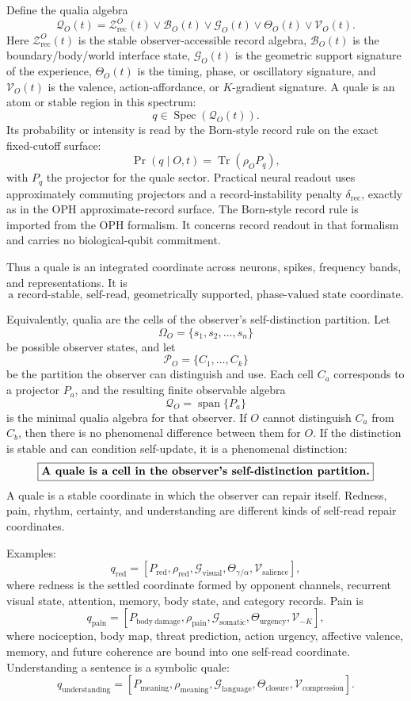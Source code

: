 \documentclass[11pt]{article}
\theoremstyle{remark}
\theoremstyle{plain}
\newcommand{\rec}{\mathrm{rec}}
\begin{document}
Define the qualia algebra
\[
\boxed{
\mathcal Q_O(t)
=
\mathcal Z_{\rec}^{O}(t)
\vee
\mathcal B_O(t)
\vee
\mathcal G_O(t)
\vee
\Theta_O(t)
\vee
\mathcal V_O(t).
}
\]
Here \(\mathcal Z_{\rec}^{O}(t)\) is the stable observer-accessible record algebra, \(\mathcal B_O(t)\) is the boundary/body/world interface state, \(\mathcal G_O(t)\) is the geometric support signature of the experience, \(\Theta_O(t)\) is the timing, phase, or oscillatory signature, and \(\mathcal V_O(t)\) is the valence, action-affordance, or \(K\)-gradient signature. A quale is an atom or stable region in this spectrum:
\[
\boxed{
q\in\operatorname{Spec}(\mathcal Q_O(t)).
}
\]
Its probability or intensity is read by the Born-style record rule on the exact fixed-cutoff surface:
\[
\Pr(q\mid O,t)=\operatorname{Tr}(\rho_O P_q),
\]
with \(P_q\) the projector for the quale sector. Practical neural readout uses approximately commuting projectors and a record-instability penalty \(\delta_{\rec}\), exactly as in the OPH approximate-record surface.
The Born-style record rule is imported from the OPH formalism. It concerns record readout in that formalism and carries no biological-qubit commitment.

Thus a quale is an integrated coordinate across neurons, spikes, frequency bands, and representations. It is
\[
\boxed{
\text{a record-stable, self-read, geometrically supported, phase-valued state coordinate.}
}
\]

Equivalently, qualia are the cells of the observer's self-distinction partition. Let
\[
\Omega_O=\{s_1,s_2,\ldots,s_n\}
\]
be possible observer states, and let
\[
\mathcal P_O=\{C_1,\ldots,C_k\}
\]
be the partition the observer can distinguish and use. Each cell \(C_a\) corresponds to a projector \(P_a\), and the resulting finite observable algebra
\[
\mathcal Q_O=\operatorname{span}\{P_a\}
\]
is the minimal qualia algebra for that observer. If \(O\) cannot distinguish \(C_a\) from \(C_b\), then there is no phenomenal difference between them for \(O\). If the distinction is stable and can condition self-update, it is a phenomenal distinction:
\[
\boxed{
\text{\bfseries A quale is a cell in the observer's self-distinction partition.}
}
\]
A quale is a stable coordinate in which the observer can repair itself. Redness, pain, rhythm, certainty, and understanding are different kinds of self-read repair coordinates.

Examples:
\[
q_{\mathrm{red}}
=
[P_{\mathrm{red}},\rho_{\mathrm{red}},\mathcal G_{\mathrm{visual}},
\Theta_{\gamma/\alpha},\mathcal V_{\mathrm{salience}}],
\]
where redness is the settled coordinate formed by opponent channels, recurrent visual state, attention, memory, body state, and category records. Pain is
\[
q_{\mathrm{pain}}
=
[P_{\mathrm{body\ damage}},\rho_{\mathrm{pain}},\mathcal G_{\mathrm{somatic}},
\Theta_{\mathrm{urgency}},\mathcal V_{-K}],
\]
where nociception, body map, threat prediction, action urgency, affective valence, memory, and future coherence are bound into one self-read coordinate. Understanding a sentence is a symbolic quale:
\[
q_{\mathrm{understanding}}
=
[P_{\mathrm{meaning}},\rho_{\mathrm{meaning}},\mathcal G_{\mathrm{language}},
\Theta_{\mathrm{closure}},\mathcal V_{\mathrm{compression}}].
\]
\end{document}
